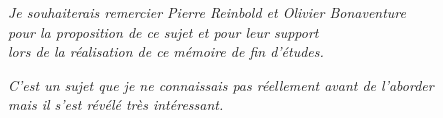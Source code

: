 \pagestyle{empty} %

\clearpage

\null\vfill %

\begin{flushright}
\emph{Je souhaiterais remercier Pierre Reinbold et Olivier Bonaventure\\pour la proposition de ce sujet et pour leur support\\lors de la réalisation de ce mémoire de fin d'études.}

\emph{C'est un sujet que je ne connaissais pas réellement avant de l'aborder\\mais il s'est révélé très intéressant.}
\end{flushright}

\vfill\vfill\vfill\vfill\vfill\null %

\clearpage
